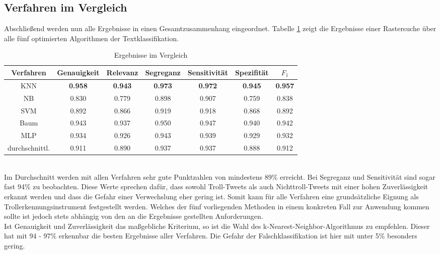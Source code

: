 \subsection{Verfahren im Vergleich}
Abschließend werden nun alle Ergebnisse in einen Gesamtzusammenhang eingeordnet. Tabelle \ref{results-all} zeigt die Ergebnisse einer Rastersuche über alle fünf optimierten Algorithmen der Textklassifikation.  
\begin{table}[htb]
	\begin{center}
		\begin{tabular}{|c|c|c|c|c|c|c|}
			\hline 
			Verfahren & Genauigkeit & Relevanz & Segreganz & Sensitivität & Spezifität & $F_1$ \\ \hline \hline
			KNN      & \textbf{0.958} & \textbf{0.943} & \textbf{0.973} & \textbf{0.972} & \textbf{0.945} & \textbf{0.957} \\ \hline
			NB   & 0.830 & 0.779 & 0.898 & 0.907 & 0.759 & 0.838 \\ \hline 
			SVM & 0.892 & 0.866 & 0.919 & 0.918 & 0.868 & 0.892 \\ \hline 
			Baum   & 0.943 & 0.937 & 0.950 & 0.947 & 0.940 & 0.942 \\ \hline
			MLP   & 0.934 & 0.926 & 0.943 & 0.939 & 0.929 & 0.932 \\ \hline \hline
			durchschnittl. & 0.911 & 0.890 & 0.937 & 0.937 & 0.888 & 0.912 \\ \hline
		\end{tabular}
		\caption{Ergebnisse im Vergleich}\label{results-all}
	\end{center}
\end{table}\\
Im Durchschnitt werden mit allen Verfahren sehr gute Punktzahlen von mindestens 89\% erreicht. Bei Segreganz und Sensitivität sind sogar fast 94\% zu beobachten. Diese Werte sprechen dafür, dass sowohl Troll-Tweets als auch Nichttroll-Tweets mit einer hohen Zuverlässigkeit erkannt werden und dass die Gefahr einer Verwechslung eher gering ist. Somit kann für alle Verfahren eine grundsätzliche Eignung als Trollerkennungsinstrument festgestellt werden. Welches der fünf vorliegenden Methoden in einem konkreten Fall zur Anwendung kommen sollte ist jedoch stets abhängig von den an die Ergebnisse gestellten Anforderungen.\\
Ist Genauigkeit und Zuverlässigkeit das maßgebliche Kriterium, so ist die Wahl des k-Nearest-Neighbor-Algorithmus zu empfehlen. Dieser hat mit 94 - 97\% erkennbar die besten Ergebnisse aller Verfahren. Die Gefahr der Falschklassifikation ist hier mit unter 5\% besonders gering.\\
